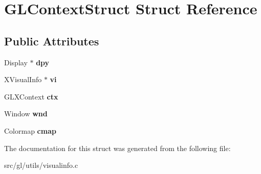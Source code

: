 \hypertarget{structGLContextStruct}{\section{\-G\-L\-Context\-Struct \-Struct \-Reference}
\label{structGLContextStruct}
}
\subsection*{\-Public \-Attributes}
\begin{DoxyCompactItemize}
\item 
\hypertarget{structGLContextStruct_a4740e9cec4473ab98a0bead1b0245d15}{\-Display $\ast$ {\bfseries dpy}}\label{structGLContextStruct_a4740e9cec4473ab98a0bead1b0245d15}

\item 
\hypertarget{structGLContextStruct_ab8436ee7e3e2fbabd21ffd051eda24e0}{\-X\-Visual\-Info $\ast$ {\bfseries vi}}\label{structGLContextStruct_ab8436ee7e3e2fbabd21ffd051eda24e0}

\item 
\hypertarget{structGLContextStruct_a57d6c9e8460fc914e21ef9dfa5178055}{\-G\-L\-X\-Context {\bfseries ctx}}\label{structGLContextStruct_a57d6c9e8460fc914e21ef9dfa5178055}

\item 
\hypertarget{structGLContextStruct_a9c9abd3d56d1751c1e79bd8f2f225d2e}{\-Window {\bfseries wnd}}\label{structGLContextStruct_a9c9abd3d56d1751c1e79bd8f2f225d2e}

\item 
\hypertarget{structGLContextStruct_a802b98c1b8ef3d2191dc6a41e1bbc786}{\-Colormap {\bfseries cmap}}\label{structGLContextStruct_a802b98c1b8ef3d2191dc6a41e1bbc786}

\end{DoxyCompactItemize}


\-The documentation for this struct was generated from the following file\-:\begin{DoxyCompactItemize}
\item 
src/gl/utils/visualinfo.\-c\end{DoxyCompactItemize}

